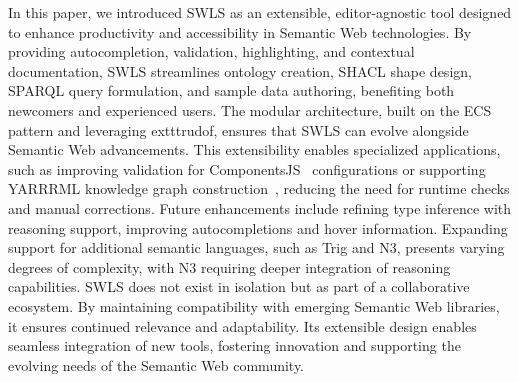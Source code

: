 In this paper, we introduced SWLS as an extensible, editor-agnostic tool designed to enhance productivity and accessibility in Semantic Web technologies. By providing autocompletion, validation, highlighting, and contextual documentation, SWLS streamlines ontology creation, SHACL shape design, SPARQL query formulation, and sample data authoring, benefiting both newcomers and experienced users.
The modular architecture, built on the ECS pattern and leveraging 	exttt{rudof}, ensures that SWLS can evolve alongside Semantic Web advancements. This extensibility enables specialized applications, such as improving validation for ComponentsJS~\cite{01GPAWNQ5ZS2DAY0J9JMPQHM9C} configurations or supporting YARRRML knowledge graph construction~\cite{Heyvaert2018Declarative}, reducing the need for runtime checks and manual corrections.
Future enhancements include refining type inference with reasoning support, improving autocompletions and hover information. Expanding support for additional semantic languages, such as Trig and N3, presents varying degrees of complexity, with N3 requiring deeper integration of reasoning capabilities.
SWLS does not exist in isolation but as part of a collaborative ecosystem. By maintaining compatibility with emerging Semantic Web libraries, it ensures continued relevance and adaptability. Its extensible design enables seamless integration of new tools, fostering innovation and supporting the evolving needs of the Semantic Web community.

